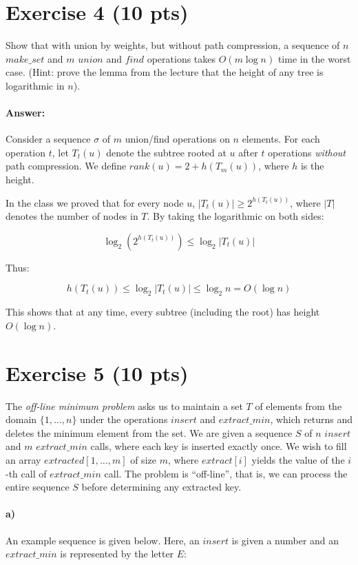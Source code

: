\documentclass[a4paper]{article}
\begin{document}
\section{Exercise 4 (10 pts)}

Show that with union by weights, but without path compression, a sequence of $n$ $make\_set$ and $m$ $union$ and $find$ operations takes $O(m \log n)$ time in the worst case. (Hint: prove the lemma from the lecture that the height of any tree is logarithmic in $n$).

\paragraph{Answer:}

Consider a sequence $\sigma$ of $m$ union/find operations on $n$ elements. For each operation $t$, let $T_t(u)$ denote the subtree rooted at $u$ after $t$ operations \emph{without} path compression. We define ${rank}(u) = 2 + h(T_m(u))$, where $h$ is the height.

In the class we proved that for every node $u$, $|T_t(u)| \ge 2^{h(T_t(u))}$, where $|T|$ denotes the number of nodes in $T$. By taking the logarithmic on both sides:

$$\log_2 (2^{h(T_t(u))}) \le \log_2 |T_t(u)|$$

Thus:

$$h(T_t(u)) \le \log_2 |T_t(u)| \le \log_2 n = O(\log n)$$

This shows that at any time, every subtree (including the root) has height $O(\log n)$.

\section{Exercise 5 (10 pts)}

The \emph{off-line minimum problem} asks us to maintain a set $T$ of elements from the domain $\{1, \ldots, n\}$ under the operations $insert$ and $extract\_min$, which returns and deletes the minimum element from the set. We are given a sequence $S$ of $n$ $insert$ and $m$ $extract\_min$ calls, where each key is inserted exactly once. We wish to fill an array $extracted[1,\ldots, m]$ of size $m$, where $extract[i]$ yields the value of the $i$-th call of $extract\_min$ call. The problem is ``off-line'', that is, we can process the entire sequence $S$ before determining any extracted key.

\paragraph{a)} An example sequence is given below. Here, an $insert$ is given a number and an $extract\_min$ is represented by the letter $E$:
\end{document}
